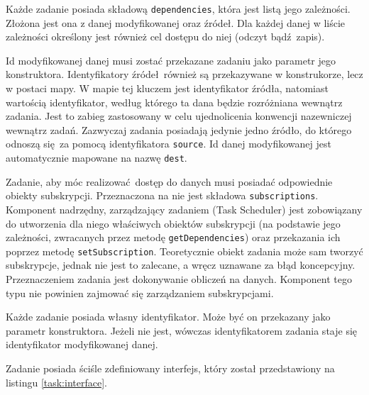 Każde zadanie posiada składową \lstinline$dependencies$, która jest listą jego zależności. Złożona jest ona z danej modyfikowanej oraz źródeł. Dla każdej danej w liście zależności określony jest również cel dostępu do niej (odczyt bądź zapis).

Id modyfikowanej danej musi zostać przekazane zadaniu jako parametr jego konstruktora. Identyfikatory źródeł również są przekazywane w konstrukorze, lecz w postaci mapy. W mapie tej kluczem jest identyfikator źródła, natomiast wartością identyfikator, według którego ta dana będzie rozróżniana wewnątrz zadania. Jest to zabieg zastosowany w celu ujednolicenia konwencji nazewniczej wewnątrz zadań. Zazwyczaj zadania posiadają jedynie jedno źródło, do którego odnoszą się za pomocą identyfikatora \lstinline$source$. Id danej modyfikowanej jest automatycznie mapowane na nazwę \lstinline$dest$. 

Zadanie, aby móc realizować dostęp do danych musi posiadać odpowiednie obiekty subskrypcji. Przeznaczona na nie jest składowa \lstinline$subscriptions$. Komponent nadrzędny, zarządzający zadaniem (Task Scheduler) jest zobowiązany do utworzenia dla niego właściwych obiektów subskrypcji (na podstawie jego zależności, zwracanych przez metodę \lstinline$getDependencies$) oraz przekazania ich poprzez metodę \lstinline$setSubscription$. Teoretycznie obiekt zadania może sam tworzyć subskrypcje, jednak nie jest to zalecane, a wręcz uznawane za błąd koncepcyjny. Przeznaczeniem zadania jest dokonywanie obliczeń na danych. Komponent tego typu nie powinien zajmować się zarządzaniem subskrypcjami.

Każde zadanie posiada własny identyfikator. Może być on przekazany jako parametr konstruktora. Jeżeli nie jest, wówczas identyfikatorem zadania staje się identyfikator modyfikowanej danej.

Zadanie posiada ściśle zdefiniowany interfejs, który został przedstawiony na listingu \ref{task:interface}.

